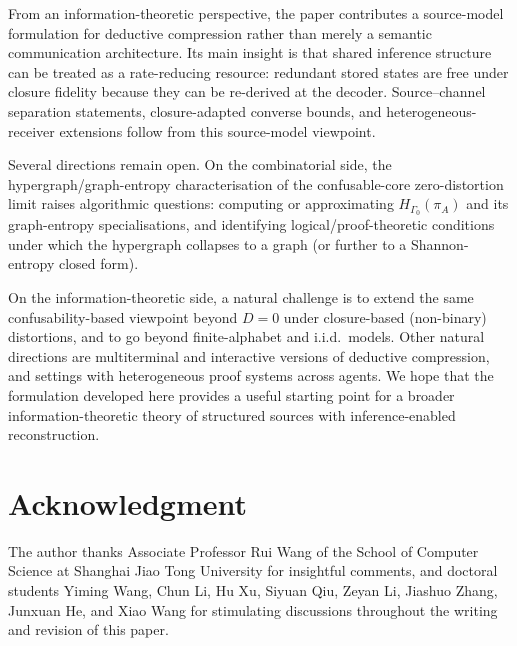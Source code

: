 \documentclass[journal,onecolumn]{IEEEtran}
\numberwithin{equation}{section}
\begin{document}
From an information-theoretic perspective, the paper contributes a
source-model formulation for deductive compression rather than merely
a semantic communication architecture. Its main insight is that shared inference structure can be treated as a rate-reducing resource: redundant stored states are free under closure fidelity because they can be re-derived at the decoder. Source--channel separation statements, closure-adapted converse bounds, and heterogeneous-receiver extensions follow from this source-model viewpoint.

Several directions remain open.
On the combinatorial side, the hypergraph/graph-entropy characterisation of the
confusable-core zero-distortion limit raises algorithmic questions: computing or
approximating \(H_{\Gamma_0}(\pi_A)\) and its graph-entropy specialisations, and
identifying logical/proof-theoretic conditions under which the hypergraph
collapses to a graph (or further to a Shannon-entropy closed form).

On the information-theoretic side, a natural challenge is to extend the same
confusability-based viewpoint beyond \(D=0\) under closure-based (non-binary)
distortions, and to go beyond finite-alphabet and i.i.d.\ models.
Other natural directions are multiterminal and interactive versions of deductive
compression, and settings with heterogeneous proof systems across agents.
We hope that the formulation developed here provides a useful starting point for
a broader information-theoretic theory of structured sources with inference-enabled
reconstruction.


\section*{Acknowledgment}

The author thanks Associate Professor Rui Wang of the School of
Computer Science at Shanghai Jiao Tong University for insightful
comments, and doctoral students Yiming Wang, Chun Li, Hu Xu,
Siyuan Qiu, Zeyan Li, Jiashuo Zhang, Junxuan He, and Xiao Wang
for stimulating discussions throughout the writing and revision of
this paper.

\appendices

\end{document}
